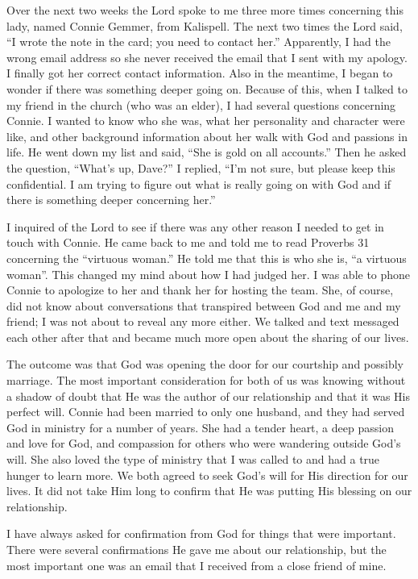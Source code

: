 \documentclass[twoside, 12pt]{book}
\begin{document}
Over the next two weeks the Lord spoke to me three more times concerning this lady, named Connie Gemmer, from Kalispell. The next two times the Lord said, “I wrote the note in the card; you need to contact her.” Apparently, I had the wrong email address so she never received the email that I sent with my apology. I finally got her correct contact information. Also in the meantime, I began to wonder if there was something deeper going on. Because of this, when I talked to my friend in the church (who was an elder), I had several questions concerning Connie. I wanted to know who she was, what her personality and character were like, and other background information about her walk with God and passions in life. He went down my list and said, “She is gold on all accounts.” Then he asked the question, “What’s up, Dave?” I replied, “I’m not sure, but please keep this confidential. I am trying to figure out what is really going on with God and if there is something deeper concerning her.” 

I inquired of the Lord to see if there was any other reason I needed to get in touch with Connie. He came back to me and told me to read Proverbs 31 concerning the “virtuous woman.” He told me that this is who she is, “a virtuous woman”. This changed my mind about how I had judged her. I was able to phone Connie to apologize to her and thank her for hosting the team. She, of course, did not know about  conversations that transpired between God and me and my  friend; I was not about to reveal any more either. We talked and text messaged each other after that and became much more open about the sharing of our lives. 

The outcome was that God was opening the door for our courtship and possibly marriage. The most important consideration for both of us was knowing without a shadow of doubt that He was the author of our relationship and that it was His perfect will. Connie had been married to only one husband, and they had served God in ministry for a number of years. She had a tender heart, a deep passion and love for God, and compassion for others who were wandering outside God’s will. She also loved the type of ministry that I was called to and had a true hunger to learn more. We both agreed to seek God’s will for His direction for our lives. It did not take Him long to confirm that He was putting His blessing on our relationship. 

I have always asked for confirmation from God for things that were important. There were several confirmations He gave me about our relationship, but the most important one was an email that I received from a close friend of mine.
\end{document}
